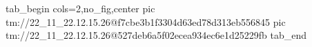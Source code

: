  
 
 
 
 

\qqSecCmtScr


\ifcmt
  tab_begin cols=2,no_fig,center
    pic tm://22_11_22.12.15.26@f7cbe3b1f3304d63ed78d313eb556845
    pic tm://22_11_22.12.15.26@527deb6a5f02ecea934ec6e1d25229fb
  tab_end
\fi

